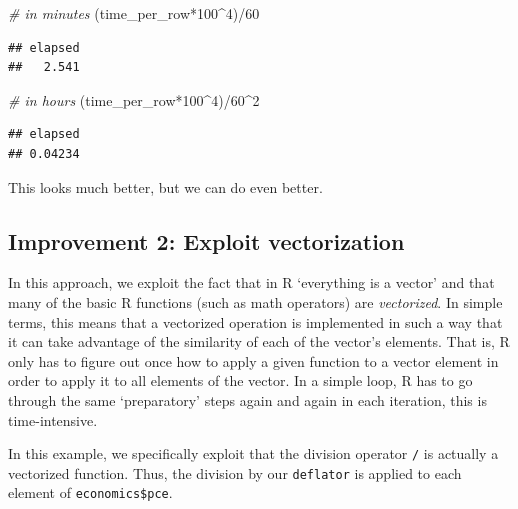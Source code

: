 \documentclass[
  12pt,
]{style/krantz}
\newenvironment{Shaded}{\begin{snugshade}}{\end{snugshade}}
\newcommand{\CommentTok}[1]{\textcolor[rgb]{0.56,0.35,0.01}{\textit{#1}}}
\newcommand{\DecValTok}[1]{\textcolor[rgb]{0.00,0.00,0.81}{#1}}
\newcommand{\NormalTok}[1]{#1}
\newcommand{\SpecialCharTok}[1]{\textcolor[rgb]{0.00,0.00,0.00}{#1}}
\begin{document}
\begin{Shaded}
\begin{Highlighting}[]
\CommentTok{\# in minutes}
\NormalTok{(time\_per\_row}\SpecialCharTok{*}\DecValTok{100}\SpecialCharTok{\^{}}\DecValTok{4}\NormalTok{)}\SpecialCharTok{/}\DecValTok{60} 
\end{Highlighting}
\end{Shaded}

\begin{verbatim}
## elapsed 
##   2.541
\end{verbatim}

\begin{Shaded}
\begin{Highlighting}[]
\CommentTok{\# in hours}
\NormalTok{(time\_per\_row}\SpecialCharTok{*}\DecValTok{100}\SpecialCharTok{\^{}}\DecValTok{4}\NormalTok{)}\SpecialCharTok{/}\DecValTok{60}\SpecialCharTok{\^{}}\DecValTok{2} 
\end{Highlighting}
\end{Shaded}

\begin{verbatim}
## elapsed 
## 0.04234
\end{verbatim}

This looks much better, but we can do even better.

\hypertarget{improvement-2-exploit-vectorization}{%
\subsection{Improvement 2: Exploit vectorization}\label{improvement-2-exploit-vectorization}}

In this approach, we exploit the fact that in R `everything is a vector' and that many of the basic R functions (such as math operators) are \emph{vectorized}. In simple terms, this means that a vectorized operation is implemented in such a way that it can take advantage of the similarity of each of the vector's elements. That is, R only has to figure out once how to apply a given function to a vector element in order to apply it to all elements of the vector. In a simple loop, R has to go through the same `preparatory' steps again and again in each iteration, this is time-intensive.

In this example, we specifically exploit that the division operator \texttt{/} is actually a vectorized function. Thus, the division by our \texttt{deflator} is applied to each element of \texttt{economics\$pce}.
\end{document}
